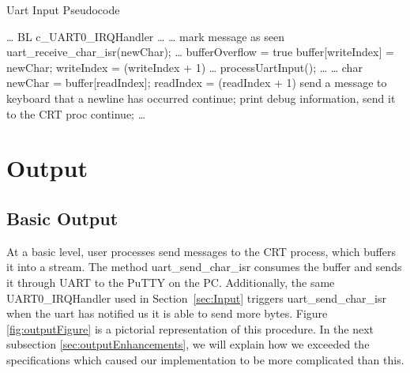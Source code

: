 \documentclass[12pt]{report}
\begin{document}
    \begin{algorithm}
        \caption{Uart Input Pseudocode}
        \label{code:uart_input}
        \begin{algorithmic}[1]
                \State \ldots
                \State BL c\_UART0\_IRQHandler
                \State \ldots
            \EndFunction
                \State \ldots
                \State mark message as seen
                \State uart\_receive\_char\_isr(newChar);
                \State \ldots
            \EndFunction
                    \State bufferOverflow = true
                    \State \Return
                \EndIf
                \State buffer[writeIndex] = newChar;
                \State writeIndex = (writeIndex + 1) %
            \EndFunction
                \State \ldots
                \State processUartInput();
                \State \ldots
            \EndFunction
                \State \ldots
                    \State char newChar = buffer[readIndex];
                    \State readIndex = (readIndex + 1) %
                        \State send a message to keyboard that a newline has occurred
                        \State continue;
                        \State print debug information, send it to the CRT proc
                        \State continue;
                    \EndIf
                \EndWhile
                \State \ldots
            \EndFunction
        \end{algorithmic}
    \end{algorithm}
\section{Output}
\subsection{Basic Output}
    At a basic level, user processes send messages to the CRT process, which
    buffers it into a stream. The method uart\_send\_char\_isr consumes the
    buffer and sends it through UART to the PuTTY on the PC. Additionally, the
    same UART0\_IRQHandler used in Section~\ref{sec:Input} triggers
    uart\_send\_char\_isr when the uart has notified us it is able to send more
    bytes. Figure \ref{fig:outputFigure} is a pictorial representation of this
    procedure. In the next subsection
    \ref{sec:outputEnhancements}, we will explain how we exceeded the
    specifications which caused our implementation to be more complicated than
    this.
\end{document}
